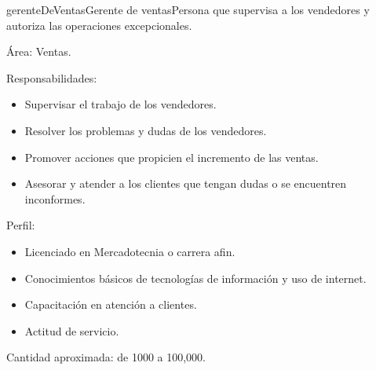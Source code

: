 \documentclass[10pt]{book}
\begin{document}
\begin{cdtActor}[version=0.1, status=\cdtStRevision]
	{gerenteDeVentas}{Gerente de ventas}{Persona que supervisa a los vendedores y autoriza las operaciones excepcionales.}
	\item[Área:] Ventas.
	\item[Responsabilidades:] \cdtEmpty 	
    \begin{itemize}
    	\item Supervisar el trabajo de los vendedores.
		\item Resolver los problemas y dudas de los vendedores.
		\item Promover acciones que propicien el incremento de las ventas.
		\item Asesorar y atender a los clientes que tengan dudas o se encuentren inconformes.
    \end{itemize}
    
	\item[Perfil:] \cdtEmpty	
    \begin{itemize}
       	\item Licenciado en Mercadotecnia o carrera afin.
		\item Conocimientos básicos de tecnologías de información y uso de internet.
		\item Capacitación en atención a clientes.
		\item Actitud de servicio.
    \end{itemize}
 
 	\item[Cantidad aproximada:] de 1000 a 100,000.
\end{cdtActor}


\end{document}
